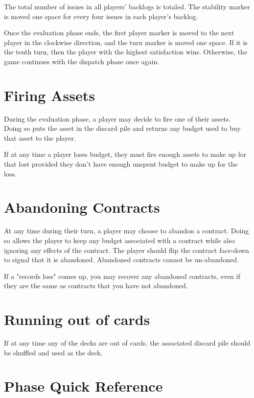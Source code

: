 \documentclass[twocolumn]{article}
\begin{document}
The total number of issues in all players' backlogs is totaled. The stability marker is moved one space for every four issues in each player's backlog.

Once the evaluation phase ends, the first player marker is moved to the next player in the clockwise direction, and the turn marker is moved one space. If it is the tenth turn, then the player with the highest satisfaction wins. Otherwise, the game continues with the dispatch phase once again.

\section*{Firing Assets}

During the evaluation phase, a player may decide to fire one of their assets. Doing so puts the asset in the discard pile and returns any budget used to buy that asset to the player.

If at any time a player loses budget, they must fire enough assets to make up for that lost provided they don't have enough unspent budget to make up for the loss.

\section*{Abandoning Contracts}

At any time during their turn, a player may choose to abandon a contract. Doing so allows the player to keep any budget associated with a contract while also ignoring any effects of the contract. The player should flip the contract face-down to signal that it is abandoned. Abandoned contracts cannot be un-abandoned.

If a "records loss" comes up, you may recover any abandoned contracts, even if they are the same as contracts that you have not abandoned.

\section*{Running out of cards}

If at any time any of the decks are out of cards, the associated discard pile should be shuffled and used as the deck.

\pagebreak

\section*{Phase Quick Reference}
\end{document}
